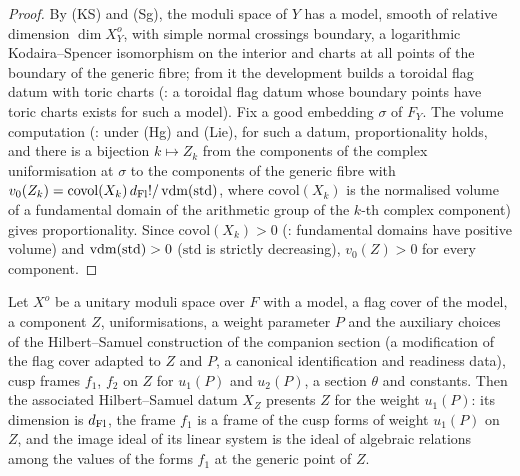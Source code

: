 \begin{proof}
By \textup{(KS)} and \textup{(Sg)}, the moduli space of $Y$ has a model, smooth of relative dimension $\dim X^o_Y$, with
simple normal crossings boundary, a logarithmic Kodaira--Spencer isomorphism on the interior and charts at all points of
the boundary of the generic fibre; from it the development builds a toroidal flag datum with toric charts (: a toroidal flag datum whose
boundary points have toric charts exists for such a model). Fix a good embedding $\sigma$ of $F_Y$. The volume
computation (: under \textup{(Hg)} and \textup{(Lie)},
for such a datum, proportionality holds, and there is a bijection $k\mapsto Z_k$ from the components of the complex
uniformisation at $\sigma$ to the components of the generic fibre with
$v_0(Z_k)=\mathrm{covol}(X_k)\,d_{\mathrm{Fl}}!/\operatorname{vdm}(\mathrm{std})$, where $\mathrm{covol}(X_k)$ is the normalised volume
of a fundamental domain of the arithmetic group of the $k$-th complex component) gives proportionality. Since
$\mathrm{covol}(X_k)>0$ (: fundamental domains have positive volume) and
$\operatorname{vdm}(\mathrm{std})>0$ ($\mathrm{std}$ is strictly decreasing), $v_0(Z)>0$ for every component.
\end{proof}

\begin{proposition}\label{pf:lift2:presents}
Let $X^o$ be a unitary moduli space over $F$ with a model, a flag cover of the model, a component $Z$,
uniformisations, a weight parameter $P$ and the auxiliary choices of the Hilbert--Samuel construction of the companion
section (a modification of the flag cover adapted to $Z$ and $P$, a canonical identification and readiness data), cusp
frames $f_1$, $f_2$ on $Z$ for $u_1(P)$ and $u_2(P)$, a section $\theta$ and constants. Then the associated
Hilbert--Samuel datum $X_Z$ presents $Z$ for the weight $u_1(P)$: its dimension is $d_{\mathrm{Fl}}$, the frame $f_1$ is a frame
of the cusp forms of weight $u_1(P)$ on $Z$, and the image ideal of its linear system is the ideal of algebraic
relations among the values of the forms $f_1$ at the generic point of $Z$.
\end{proposition}

